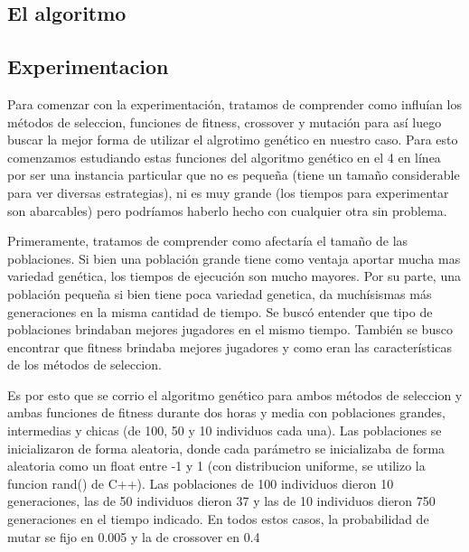 \documentclass[A4paper,oneside,fleqn,11pt]{article}
\theoremstyle{definition}
\begin{document}
\subsection{El algoritmo}



\subsection{Experimentacion}

Para comenzar con la experimentación, tratamos de comprender como influían los métodos de seleccion, funciones de fitness, crossover y mutación para así luego buscar la mejor forma de utilizar el algrotimo genético en nuestro caso. Para esto comenzamos estudiando estas funciones del algoritmo genético en el 4 en línea por ser una instancia particular que no es pequeña (tiene un tamaño considerable para ver diversas estrategias), ni es muy grande (los tiempos para experimentar son abarcables) pero podríamos haberlo hecho con cualquier otra sin problema.


Primeramente, tratamos de comprender como afectaría el tamaño de las poblaciones. Si bien una población grande tiene como ventaja aportar mucha mas variedad genética, los tiempos de ejecución son mucho mayores. Por su parte, una población pequeña si bien tiene poca variedad genetica, da muchísismas más generaciones en la misma cantidad de tiempo. Se buscó entender que tipo de poblaciones brindaban mejores jugadores en el mismo tiempo. También se busco encontrar que fitness brindaba mejores jugadores y como eran las características de los métodos de seleccion.

Es por esto que se corrio el algoritmo genético para ambos métodos de seleccion y ambas funciones de fitness durante dos horas y media con poblaciones grandes, intermedias y chicas (de 100, 50 y 10 individuos cada una). Las poblaciones se inicializaron de forma aleatoria, donde cada parámetro se inicializaba de forma aleatoria como un float entre -1 y 1 (con distribucion uniforme, se utilizo la funcion rand() de C++). Las poblaciones de 100 individuos dieron 10 generaciones, las de 50 individuos dieron 37 y las de 10 individuos dieron 750 generaciones en el tiempo indicado. En todos estos casos, la probabilidad de mutar se fijo en 0.005 y la de crossover en 0.4
\end{document}
